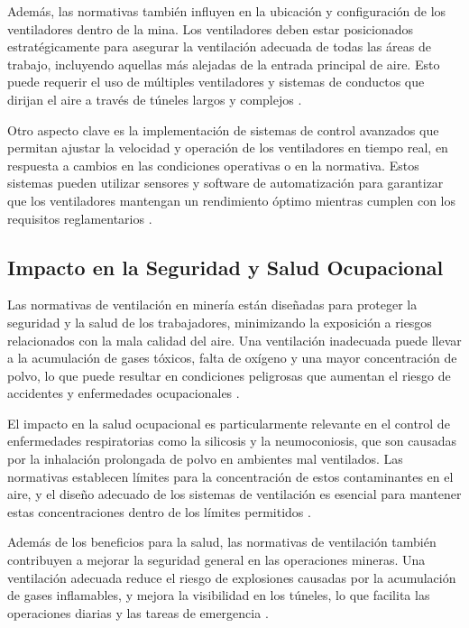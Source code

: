 Además, las normativas también influyen en la ubicación y configuración de los ventiladores dentro de la mina. Los ventiladores deben estar posicionados estratégicamente para asegurar la ventilación adecuada de todas las áreas de trabajo, incluyendo aquellas más alejadas de la entrada principal de aire. Esto puede requerir el uso de múltiples ventiladores y sistemas de conductos que dirijan el aire a través de túneles largos y complejos \cite{mcpherson1993subsurface}.

Otro aspecto clave es la implementación de sistemas de control avanzados que permitan ajustar la velocidad y operación de los ventiladores en tiempo real, en respuesta a cambios en las condiciones operativas o en la normativa. Estos sistemas pueden utilizar sensores y software de automatización para garantizar que los ventiladores mantengan un rendimiento óptimo mientras cumplen con los requisitos reglamentarios \cite{goldstein2017intelligent}.

\subsection{Impacto en la Seguridad y Salud Ocupacional}

Las normativas de ventilación en minería están diseñadas para proteger la seguridad y la salud de los trabajadores, minimizando la exposición a riesgos relacionados con la mala calidad del aire. Una ventilación inadecuada puede llevar a la acumulación de gases tóxicos, falta de oxígeno y una mayor concentración de polvo, lo que puede resultar en condiciones peligrosas que aumentan el riesgo de accidentes y enfermedades ocupacionales \cite{franklin2014respiratory}.

El impacto en la salud ocupacional es particularmente relevante en el control de enfermedades respiratorias como la silicosis y la neumoconiosis, que son causadas por la inhalación prolongada de polvo en ambientes mal ventilados. Las normativas establecen límites para la concentración de estos contaminantes en el aire, y el diseño adecuado de los sistemas de ventilación es esencial para mantener estas concentraciones dentro de los límites permitidos \cite{cline2011occupational}.

Además de los beneficios para la salud, las normativas de ventilación también contribuyen a mejorar la seguridad general en las operaciones mineras. Una ventilación adecuada reduce el riesgo de explosiones causadas por la acumulación de gases inflamables, y mejora la visibilidad en los túneles, lo que facilita las operaciones diarias y las tareas de emergencia \cite{chekan2002respirable}. 

